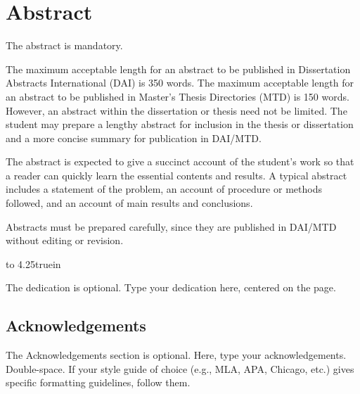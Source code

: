 \documentclass[12pt,oneside, letterpaper]{book}
\begin{document}
\chapter*{Abstract}
\par The abstract is mandatory.
\par The maximum acceptable length for an abstract to be published in Dissertation Abstracts International (DAI) is 350 words. The maximum acceptable length for an abstract to be published in Master’s Thesis Directories (MTD) is 150 words. However, an abstract within the dissertation or thesis need not be limited. The student may prepare a lengthy abstract for inclusion in the thesis or dissertation and a more concise summary for publication in DAI/MTD. 
\par The abstract is expected to give a succinct account of the student's work so that a reader can quickly learn the essential contents and results. A typical abstract includes a statement of the problem, an account of procedure or methods followed, and an account of main results and conclusions.
\par Abstracts must be prepared carefully, since they are published in DAI/MTD without editing or revision.

\newpage

\vbox to 4.25truein{}
\centerline{The dedication is optional. Type your dedication here, centered on the page.}

\newpage
\begin{doublespace}
\chapter*{Acknowledgements}
\par The Acknowledgements section is optional. Here, type your acknowledgements. Double-space. If your style guide of choice (e.g., MLA, APA, Chicago, etc.) gives specific formatting guidelines, follow them.
\end{doublespace}
\end{document}
